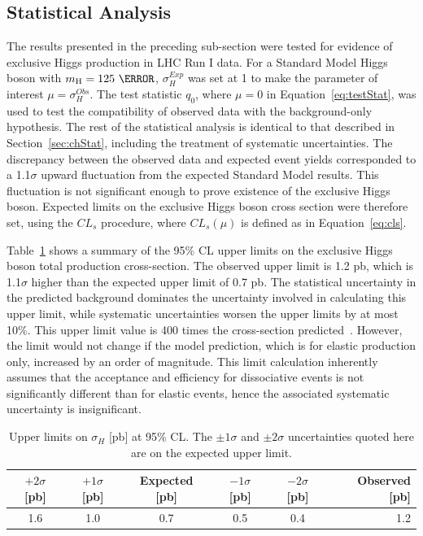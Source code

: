 \subsection{Statistical Analysis}
\par The results presented in the preceding sub-section were tested for evidence of exclusive Higgs 
production in LHC Run I data. For a Standard Model Higgs boson with $m_{\text{H}} = 125~\GeV$, 
$\sigma^{Exp}_{H}$ was set at 
1 to make the parameter of interest $\mu=\sigma^{Obs}_{H}$. The test statistic $q_0$, where $\mu=0$ 
in Equation~\ref{eq:testStat}, was used to test the compatibility 
of observed data with the background-only hypothesis. The rest of the statistical analysis is identical 
to that described in Section~\ref{sec:chStat}, including the treatment of systematic uncertainties.
The discrepancy between the observed data and expected event yields corresponded to a 1.1$\sigma$ 
upward fluctuation from the expected Standard Model results. This fluctuation is not significant enough 
to prove existence of the exclusive Higgs boson. Expected limits on the exclusive Higgs boson 
cross section were therefore set, using the $CL_s$ procedure, where $CL_s(\mu)$ is defined as in Equation~\ref{eq:cls}. 

\par Table~\ref{tab:models} shows a summary of the 95\% CL upper limits on the exclusive 
Higgs boson total production cross-section.
The observed upper limit is 1.2 pb, which is 1.1$\sigma$ higher than the expected 
upper limit of 0.7 pb. The statistical uncertainty in the predicted background dominates the
uncertainty involved in calculating this upper limit, 
while systematic uncertainties worsen the upper limits by at most 10\%.
This upper limit value is 400 times the cross-section predicted~\cite{Khoze}.
However, the limit would not change if the model prediction, which is for
elastic production only, increased by an order of magnitude. This limit calculation 
inherently assumes that the acceptance and efficiency for dissociative
events is not significantly different than for elastic events, hence
the associated systematic uncertainty is insignificant.

\begin{table}
\centering
\begin{tabular}{|cc|c|cc||r|}
\hline
$+2\sigma$ [pb] & $+1\sigma$ [pb] & Expected [pb] & $-1\sigma$ [pb] & $-2\sigma$ [pb] & Observed [pb] \\
\hline\hline
 1.6 & 1.0  & 0.7 &  0.5 &  0.4 & 1.2 \\
\hline 
\end{tabular}
\caption{Upper limits on $\sigma_H$ [pb] at 95\% CL. The $\pm 1\sigma$ and $\pm 2\sigma$ uncertainties quoted here are on the expected upper limit.}
\label{tab:models}
\end{table}
